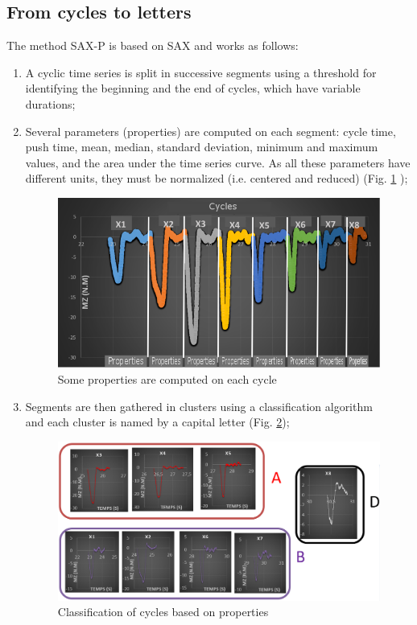 \subsection{From cycles to letters}
The method SAX-P is based on SAX and works as follows:  
\begin{enumerate}
\item A cyclic time series is split in successive segments using a threshold
for identifying the beginning and the end of cycles, which have variable
durations;	
\item Several parameters (properties) are computed on each segment: cycle
time, push time, mean, median, standard deviation, minimum and maximum
values, and the area under the time series curve. As all these parameters
have different units, they must be normalized (i.e. centered and reduced) (Fig. \ref{fig:property} );

	 \begin{figure}[h]
  \centering
   \includegraphics[scale=0.4]{images/sax-p/sax-p_deplacement_property}
    \caption{Some properties are computed on each cycle}
  \label{fig:property}
  \end{figure}
	
 
\item Segments are then gathered in clusters using a classification algorithm \\
\cite{Esling2012} and each cluster is named by a capital letter (Fig. \ref{fig:classification}); 

	 \begin{figure}[h]
  \centering
   \includegraphics[scale=0.4]{images/sax-p/regroupement}
    \caption{Classification of cycles based on properties}
  \label{fig:classification}
  \end{figure}
	

\end{enumerate}
